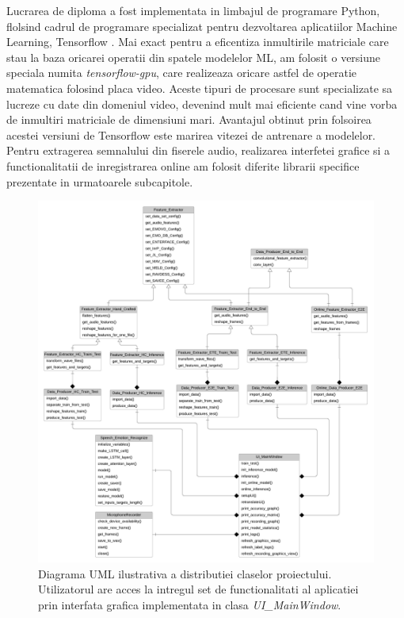 \documentclass[a4paper,12pt]{book}
\begin{document}
				Lucrarea de diploma a fost implementata in limbajul de programare Python, flolsind cadrul de programare specializat pentru dezvoltarea aplicatiilor Machine Learning, Tensorflow \cite{tensorflow}. Mai exact pentru a eficentiza inmultirile matriciale care stau la baza oricarei operatii din spatele modelelor ML, am folosit o versiune speciala numita \textit{tensorflow-gpu}, care realizeaza oricare astfel de operatie matematica folosind placa video. Aceste tipuri de procesare sunt specializate sa lucreze cu date din domeniul video, devenind mult mai eficiente cand vine vorba de inmultiri matriciale de dimensiuni mari. Avantajul obtinut prin folsoirea acestei versiuni de Tensorflow este marirea  vitezei de antrenare a modelelor. Pentru extragerea semnalului din fiserele audio, realizarea interfetei grafice si a functionalitatii de inregistrarea online am folosit diferite librarii specifice prezentate in urmatoarele subcapitole. \par
				\begin{figure}[p]
					\hspace*{-1,5cm}
					\centering
					\includegraphics[scale=0.56]{uml}
					\caption{Diagrama UML ilustrativa a distributiei claselor proiectului. Utilizatorul are acces la intregul set de functionalitati al aplicatiei prin interfata grafica implementata in clasa \textit{UI\_MainWindow}.}
					\label{fig:uml}
				\end{figure} 
			
\end{document}
